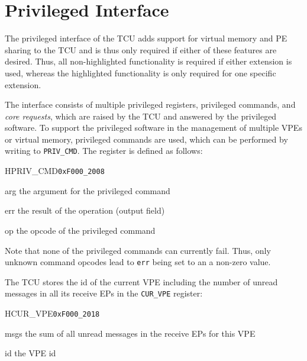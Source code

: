 \chapter{Privileged Interface}

The privileged interface of the TCU adds support for virtual memory and PE sharing to the TCU and is
thus only required if either of these features are desired. Thus, all non-highlighted functionality
is required if either extension is used, whereas the highlighted functionality is only required for
one specific extension.

The interface consists of multiple privileged registers, privileged commands, and \emph{core
requests}, which are raised by the TCU and answered by the privileged software. To support the
privileged software in the management of multiple VPEs or virtual memory, privileged commands are
used, which can be performed by writing to \texttt{PRIV\_CMD}. The register is defined as follows:

\begin{register}{H}{PRIV\_CMD}{\texttt{0xF000\_2008}}
  \regnewline%
  \begin{regdesc}\begin{reglist}
    \item[arg] the argument for the privileged command
    \item[err] the result of the operation (output field)
    \item[op] the opcode of the privileged command
  \end{reglist}\end{regdesc}
\end{register}

\noindent Note that none of the privileged commands can currently fail. Thus, only unknown command
opcodes lead to \texttt{err} being set to an a non-zero value.

\noindent The TCU stores the id of the current VPE including the number of unread messages in all
its receive EPs in the \texttt{CUR\_VPE} register:

\setlength{\regWidth}{.95\textwidth}
\begin{register}{H}{CUR\_VPE}{\texttt{0xF000\_2018}}
  \regnewline%
  \begin{regdesc}\begin{reglist}
    \item[msgs] the sum of all unread messages in the receive EPs for this VPE
    \item[id] the VPE id
  \end{reglist}\end{regdesc}
\end{register}
\setlength{\regWidth}{\textwidth}
\extend{}

